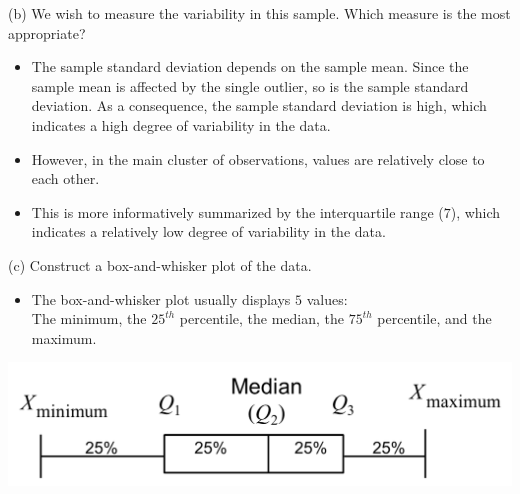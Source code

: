 \documentclass[
  11pt,
  ignorenonframetext,
]{beamer}
\providecommand{\tightlist}{%
  \setlength{\itemsep}{0pt}\setlength{\parskip}{0pt}}
\begin{document}
\begin{frame}{(b) We wish to measure the variability in this sample.
\quad Which measure is the most appropriate?}
\protect\hypertarget{b-we-wish-to-measure-the-variability-in-this-sample.-which-measure-is-the-most-appropriate-1}{}
\begin{itemize}
\item
  The sample standard deviation depends on the sample mean. Since the
  sample mean is affected by the single outlier, so is the sample
  standard deviation. As a consequence, the sample standard deviation is
  high, which indicates a high degree of variability in the data.
\item
  However, in the main cluster of observations, values are relatively
  close to each other.
\item
  This is more informatively summarized by the interquartile range
  (\(7\)), which indicates a relatively low degree of variability in the
  data.
\end{itemize}
\end{frame}

\begin{frame}{(c) Construct a box-and-whisker plot of the data.}
\protect\hypertarget{c-construct-a-box-and-whisker-plot-of-the-data.}{}
\pause

\begin{itemize}
\tightlist
\item
  The box-and-whisker plot usually displays \(5\) values:\\
  The minimum, the \(25^{th}\) percentile, the median, the \(75^{th}\)
  percentile, and the maximum.
\end{itemize}

\begin{center}\includegraphics[width=0.7\linewidth]{pictures/Box-and-Whisker} \end{center}
\end{frame}
\end{document}
